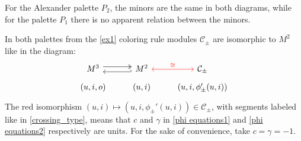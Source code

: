 \begin{example}
\begin{center}
  \end{center}
  
  For the Alexander palette $P_2$, the minors are the same in both diagrams, while for the palette $P_1$ there is no apparent relation between the minors.
\end{example}



In both palettes from the \cref{ex1} coloring rule modules $\mathcal{C}_\pm$ are isomorphic to $M^2$ like in the diagram:
    $$
    \begin{tikzcd}[row sep=tiny]
      M^3 \arrow[r, twoheadrightarrow, yshift=.7ex] \arrow[r, hookleftarrow, yshift=-.7ex] & M^2 \arrow[r, red, "\cong", leftrightarrow] & \mathcal{C}_\pm\\ 
      (u,i,o) & (u, i) & (u, i, \phi_\pm'(u,i))
    \end{tikzcd}
    $$
The red isomorphism $(u, i)\mapsto (u, i, \phi_\pm'(u, i))\in\mathcal{C}_\pm$, with segments labeled like in \cref{crossing_type}, means that $c$ and $\gamma$ in \eqref{phi equations1} and \eqref{phi equations2} respectively are units. For the sake of convenience, take $c=\gamma=-1$.

